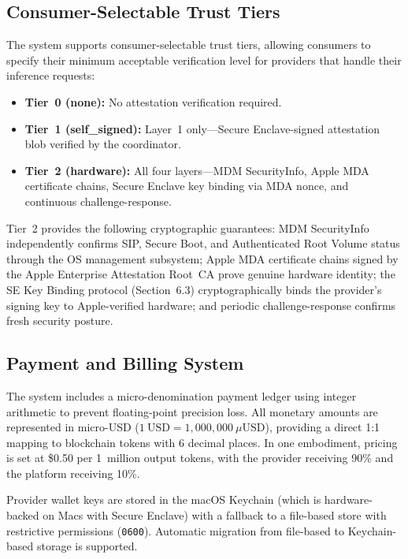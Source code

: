 \documentclass[11pt,letterpaper]{article}
\begin{document}
\subsection{Consumer-Selectable Trust Tiers}

The system supports consumer-selectable trust tiers, allowing consumers to specify their minimum acceptable verification level for providers that handle their inference requests:

\begin{itemize}[nosep]
\item \textbf{Tier~0 (none):} No attestation verification required.
\item \textbf{Tier~1 (self\_signed):} Layer~1 only---Secure Enclave-signed attestation blob verified by the coordinator.
\item \textbf{Tier~2 (hardware):} All four layers---MDM SecurityInfo, Apple MDA certificate chains, Secure Enclave key binding via MDA nonce, and continuous challenge-response.
\end{itemize}

Tier~2 provides the following cryptographic guarantees: MDM SecurityInfo independently confirms SIP, Secure Boot, and Authenticated Root Volume status through the OS management subsystem; Apple MDA certificate chains signed by the Apple Enterprise Attestation Root~CA prove genuine hardware identity; the SE Key Binding protocol (Section~6.3) cryptographically binds the provider's signing key to Apple-verified hardware; and periodic challenge-response confirms fresh security posture.

\subsection{Payment and Billing System}

The system includes a micro-denomination payment ledger using integer arithmetic to prevent floating-point precision loss. All monetary amounts are represented in micro-USD ($1~\mathrm{USD} = 1{,}000{,}000~\mu\mathrm{USD}$), providing a direct 1:1 mapping to blockchain tokens with 6 decimal places. In one embodiment, pricing is set at \$0.50 per 1~million output tokens, with the provider receiving 90\% and the platform receiving 10\%.

Provider wallet keys are stored in the macOS Keychain (which is hardware-backed on Macs with Secure Enclave) with a fallback to a file-based store with restrictive permissions (\texttt{0600}). Automatic migration from file-based to Keychain-based storage is supported.
\end{document}
